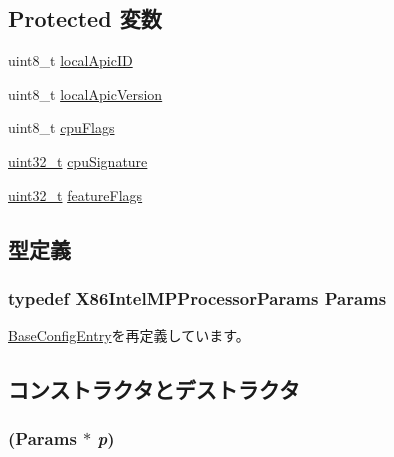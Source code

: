 \subsection*{Protected 変数}
\begin{DoxyCompactItemize}
\item 
uint8\_\-t \hyperlink{classX86ISA_1_1IntelMP_1_1Processor_a10016e4c89b2d8f761a40db4325ea961}{localApicID}
\item 
uint8\_\-t \hyperlink{classX86ISA_1_1IntelMP_1_1Processor_a2e061a4431641c9848fe7302e8d24592}{localApicVersion}
\item 
uint8\_\-t \hyperlink{classX86ISA_1_1IntelMP_1_1Processor_a9a064a8571653f3ff0bb74c8b77ca4e5}{cpuFlags}
\item 
\hyperlink{Type_8hh_a435d1572bf3f880d55459d9805097f62}{uint32\_\-t} \hyperlink{classX86ISA_1_1IntelMP_1_1Processor_a3f5b0fc0253266dd79014927e091b377}{cpuSignature}
\item 
\hyperlink{Type_8hh_a435d1572bf3f880d55459d9805097f62}{uint32\_\-t} \hyperlink{classX86ISA_1_1IntelMP_1_1Processor_a465a5eabfe70ec9150773a83bf7b59e3}{featureFlags}
\end{DoxyCompactItemize}


\subsection{型定義}
\hypertarget{classX86ISA_1_1IntelMP_1_1Processor_a7e3febf745d41a8475b39c400cec69a8}{
\subsubsection[{Params}]{\setlength{\rightskip}{0pt plus 5cm}typedef X86IntelMPProcessorParams {\bf Params}}}
\label{classX86ISA_1_1IntelMP_1_1Processor_a7e3febf745d41a8475b39c400cec69a8}


\hyperlink{classX86ISA_1_1IntelMP_1_1BaseConfigEntry_a94814126eb2e681fbf4837ed24d18616}{BaseConfigEntry}を再定義しています。

\subsection{コンストラクタとデストラクタ}
\hypertarget{classX86ISA_1_1IntelMP_1_1Processor_a3eb127f7e6b23013a2f43dab6bffd8d3}{
\subsubsection[{Processor}]{ ({\bf Params} $\ast$ {\em p})}}
\label{classX86ISA_1_1IntelMP_1_1Processor_a3eb127f7e6b23013a2f43dab6bffd8d3}



